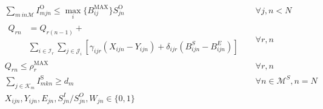 \begin{align}
&\sum_{m \ in \mathcal{M}} I_{mjn}^\text{O} \le \max_i \{B_{ij}^{\text{MAX}}\} S_{jn}^\text{O} && \forall j, n < N \\
&\begin{aligned}
Q_{rn} &= Q_{r(n-1)} +\\ &\sum_{i \in \mathcal{I}_r} \sum_{j \in \mathcal{J}_i} [\gamma_{ijr} (X_{ijn} - Y_{ijn}) + \delta_{ijr} (B_{ijn}^S - B_{ijn}^E)] 
\end{aligned}&& \forall r, n \\
&Q_{rn} \le \rho_r^\text{MAX} &&\forall r, n \\
&\sum_{j \in \mathcal{K}_m} I_{mkn}^\text{S} \ge d_m &&\forall n \in \mathcal{M}^S, n = N \\
&X_{ijn}, Y_{ijn}, E_{jn}, S_{jn}^I/S_{jn}^O, W_{jn} \in \{0,1\}
\end{align}

